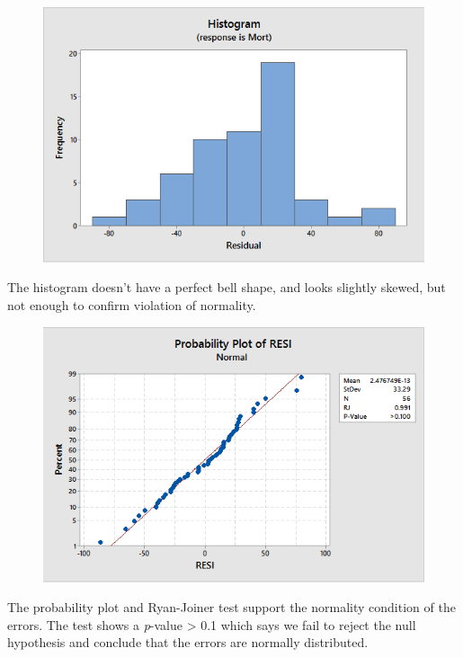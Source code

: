 \documentclass{article}
\begin{document}
\begin{figure}[h!]
 \centering
 \includegraphics[scale=.5]{./images/histogram_residuals.png}
\end{figure}

The histogram doesn't have a perfect
bell shape, and looks slightly skewed, but not enough to confirm
violation of normality.

\newpage
\begin{figure}[h!]
 \centering
 \includegraphics[scale=.5]{./images/probabilityPlot_residuals.png}
\end{figure}

The probability plot and Ryan-Joiner test
support the normality condition of the errors. The test shows a
\emph{p}-value \textgreater{} 0.1 which says we fail to reject the null
hypothesis and conclude that the errors are normally distributed.
\end{document}
